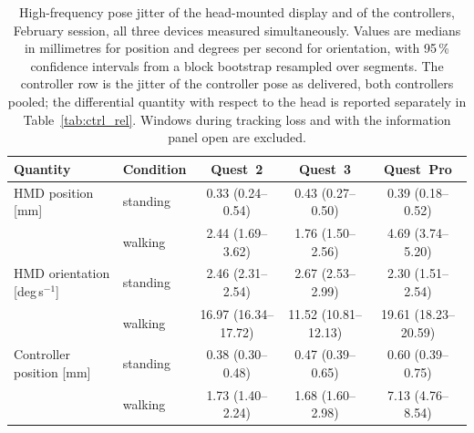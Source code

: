 \begin{table}[t]
\caption{High-frequency pose jitter of the head-mounted display and of the controllers, February session, all three devices measured simultaneously. Values are medians in millimetres for position and degrees per second for orientation, with 95\,\% confidence intervals from a block bootstrap resampled over segments. The controller row is the jitter of the controller pose as delivered, both controllers pooled; the differential quantity with respect to the head is reported separately in Table~\ref{tab:ctrl_rel}. Windows during tracking loss and with the information panel open are excluded.}\label{tab:jitter}
\begin{tabular}{llccc}
\toprule
Quantity & Condition & Quest~2 & Quest~3 & Quest~Pro \\
\midrule
HMD position [mm] & standing & 0.33 (0.24--0.54) & 0.43 (0.27--0.50) & 0.39 (0.18--0.52) \\
 & walking & 2.44 (1.69--3.62) & 1.76 (1.50--2.56) & 4.69 (3.74--5.20) \\
\addlinespace
HMD orientation [deg\,s$^{-1}$] & standing & 2.46 (2.31--2.54) & 2.67 (2.53--2.99) & 2.30 (1.51--2.54) \\
 & walking & 16.97 (16.34--17.72) & 11.52 (10.81--12.13) & 19.61 (18.23--20.59) \\
\addlinespace
Controller position [mm] & standing & 0.38 (0.30--0.48) & 0.47 (0.39--0.65) & 0.60 (0.39--0.75) \\
 & walking & 1.73 (1.40--2.24) & 1.68 (1.60--2.98) & 7.13 (4.76--8.54) \\
\bottomrule
\end{tabular}
\end{table}